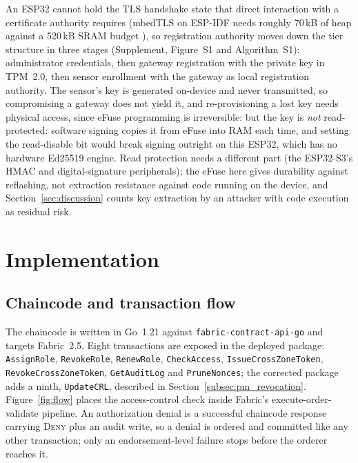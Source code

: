 \documentclass[a4paper,fleqn]{cas-sc}
\begin{document}
An ESP32 cannot hold the TLS handshake state that direct interaction with a
certificate authority requires (mbedTLS on ESP-IDF needs roughly 70\,kB of
heap against a 520\,kB SRAM budget \cite{raza2013lithe}), so registration
authority moves down the tier structure in three stages (Supplement,
Figure~S1 and Algorithm~S1): administrator credentials, then gateway
registration with the private key in TPM~2.0, then sensor enrollment with
the gateway as local registration authority. The sensor's key is generated
on-device and never transmitted, so compromising a gateway does not yield
it, and re-provisioning a lost key needs physical access, since eFuse
programming is irreversible: but the key is \emph{not} read-protected:
software signing copies it from eFuse into RAM each time, and setting the
read-disable bit would break signing outright on this ESP32, which has no
hardware Ed25519 engine. Read protection needs a different part (the
ESP32-S3's HMAC and digital-signature peripherals); the eFuse here gives
durability against reflashing, not extraction resistance against code
running on the device, and Section~\ref{sec:discussion} counts key
extraction by an attacker with code execution as residual risk.

\FloatBarrier
\section{Implementation}
\label{sec:impl}

\subsection{Chaincode and transaction flow}
\label{subsec:chaincode}

The chaincode is written in Go~1.21 against \texttt{fabric-contract-api-go}
and targets Fabric~2.5. Eight transactions are exposed in the deployed
package: \texttt{AssignRole}, \texttt{RevokeRole}, \texttt{RenewRole},
\texttt{CheckAccess}, \texttt{IssueCrossZoneToken},
\texttt{RevokeCrossZoneToken}, \texttt{GetAuditLog} and \texttt{PruneNonces};
the corrected package adds a ninth, \texttt{UpdateCRL}, described in
Section~\ref{subsec:pm_revocation}. Figure~\ref{fig:flow} places the
access-control check inside Fabric's execute-order-validate pipeline. An
authorization denial is a successful chaincode response carrying
\textsc{Deny} plus an audit write, so a denial is ordered and committed like
any other transaction; only an endorsement-level failure stops before the
orderer reaches it.
\end{document}
